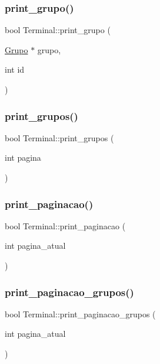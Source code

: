 \subsubsection{\texorpdfstring{print\+\_\+grupo()}{print\_grupo()}}
{\footnotesize\ttfamily bool Terminal\+::print\+\_\+grupo (\begin{DoxyParamCaption}\item[{\hyperlink{classGrupo}{Grupo} $\ast$}]{grupo,  }\item[{int}]{id }\end{DoxyParamCaption})}

\mbox{\label{classTerminal_a1b8493b5a3ad18fe1f0ee784a70c6d77}} 
\subsubsection{\texorpdfstring{print\+\_\+grupos()}{print\_grupos()}}
{\footnotesize\ttfamily bool Terminal\+::print\+\_\+grupos (\begin{DoxyParamCaption}\item[{int}]{pagina }\end{DoxyParamCaption})}

\mbox{\label{classTerminal_a4b1699a246eedcad0762c074c27ed3dc}} 
\subsubsection{\texorpdfstring{print\+\_\+paginacao()}{print\_paginacao()}}
{\footnotesize\ttfamily bool Terminal\+::print\+\_\+paginacao (\begin{DoxyParamCaption}\item[{int}]{pagina\+\_\+atual }\end{DoxyParamCaption})}

\mbox{\label{classTerminal_a33b9112ee605314c941413afd3d045fc}} 
\subsubsection{\texorpdfstring{print\+\_\+paginacao\+\_\+grupos()}{print\_paginacao\_grupos()}}
{\footnotesize\ttfamily bool Terminal\+::print\+\_\+paginacao\+\_\+grupos (\begin{DoxyParamCaption}\item[{int}]{pagina\+\_\+atual }\end{DoxyParamCaption})}

